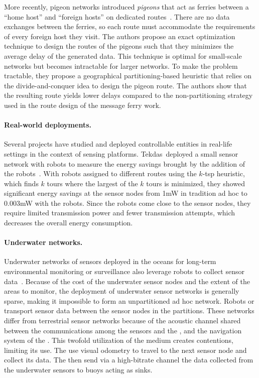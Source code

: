 More recently, pigeon networks introduced \textit{pigeons} that act as ferries between a ``home host'' and ``foreign hosts'' on dedicated routes~\cite{zhou2013minimizing}. There are no data exchanges between the ferries, so each route must accommodate the requirements of every foreign host they visit. The authors propose an exact optimization technique to design the routes of the pigeons such that they minimizes the average delay of the generated data. This technique is optimal for small-scale networks but becomes intractable for larger networks. To make the problem tractable, they propose a geographical partitioning-based heuristic that relies on the divide-and-conquer idea to design the pigeon route. The authors show that the resulting route yields lower delays compared to the non-partitioning strategy used in the route design of the message ferry work.

\paragraph{Real-world deployments.}
Several projects have studied and deployed controllable entities in real-life settings in the context of sensing platforms. Tekdas~\etal deployed a small sensor network with robots to measure the energy savings brought by the addition of the robots~\cite{tekdas2009using}. With robots assigned to different routes using the $k$-\acrshort{tsp} heuristic, which finds $k$ tours where the largest of the $k$ tours is minimized, they showed significant energy savings at the sensor nodes from 1mW in tradition ad hoc to 0.003mW with the robots. Since the robots come close to the sensor nodes, they require limited transmission power and fewer transmission attempts, which decreases the overall energy consumption. 

\paragraph{Underwater networks.}
Underwater networks of sensors deployed in the oceans for long-term environmental monitoring or surveillance also leverage robots to collect sensor data~\cite{partan2007survey,akyildiz2005underwater,dunbabin2006data}. Because of the cost of the underwater sensor nodes and the extent of the areas to monitor, the deployment of underwater sensor networks is generally sparse, making it impossible to form an unpartitioned ad hoc network. Robots or  transport sensor data between the sensor nodes in the partitions. These networks differ from terrestrial sensor networks because of the acoustic channel shared between the communications among the sensors and the , and the navigation system of the . This twofold utilization of the medium creates contentions, limiting its use. The  use visual odometry to travel to the next sensor node and collect its data. The  then send via a high-bitrate channel the data collected from the underwater sensors to buoys acting as sinks.

